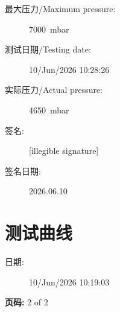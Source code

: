 \documentclass[UTF8,10pt,a4paper,fontset=fandol]{ctexart}
\newcommand{\fieldvalue}[1]{#1}
\newcommand{\handwritten}[1]{#1}
\begin{document}
\begin{description}
\item[最大压力/Maximum pressure:] 
\fieldvalue{7000~mbar}

\item[测试日期/Testing date:] 
\fieldvalue{10/Jun/2026 10:28:26}

\item[实际压力/Actual pressure:] 
\fieldvalue{4650~mbar}

\item[签名:] 
\fieldvalue{\handwritten{[illegible signature]}}

\item[签名日期:] 
\fieldvalue{\handwritten{2026.06.10}}
\end{description}


\section{测试曲线}

\begin{description}
\item[日期:] 
\fieldvalue{10/Jun/2026 10:19:03}
\end{description}

\noindent
\textbf{页码:} 2 of 2
\end{document}
